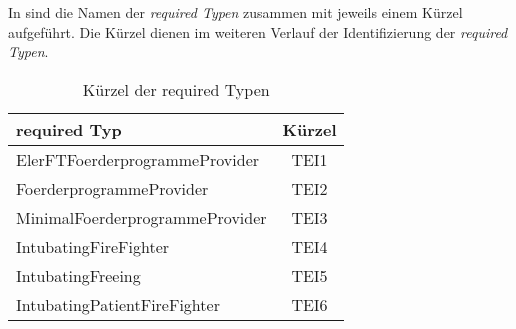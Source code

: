 %
%
%
In  sind die Namen der \emph{required Typen} zusammen mit jeweils einem Kürzel aufgeführt. Die Kürzel dienen im weiteren Verlauf der Identifizierung der \emph{required Typen}.
\begin{table}[h!]
\centering
\small
\begin{tabular}{|l|c|}
\hline
\hline
\centering\textbf{required Typ} & \textbf{Kürzel} \\
\hline
\hline
ElerFTFoerderprogrammeProvider & TEI1\\
\hline
FoerderprogrammeProvider & TEI2\\
\hline
MinimalFoerderprogrammeProvider & TEI3\\
\hline
IntubatingFireFighter & TEI4\\
\hline
IntubatingFreeing & TEI5\\
\hline
IntubatingPatientFireFighter & TEI6\\
\hline
\hline
\end{tabular}
\caption{Kürzel der required Typen}
 \label{tab:eIShort}
\end{table}
\noindent


